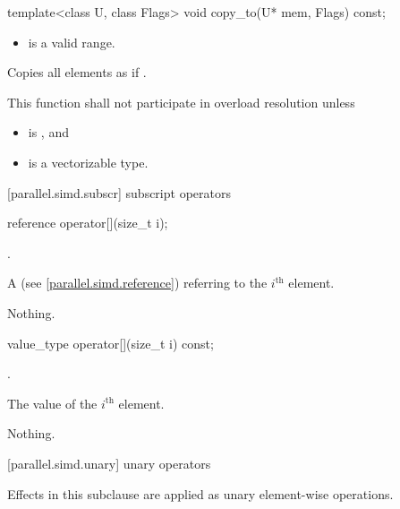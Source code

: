 \begin{itemdecl}
template<class U, class Flags> void copy_to(U* mem, Flags) const;
\end{itemdecl}

\begin{itemdescr}
  \pnum\requires
  \begin{itemize}
    \item \tcode{[mem, mem + size())} is a valid range.
  \end{itemize}

  \pnum\effects
  Copies all  elements as if  \foralli.

  \pnum\remarks
  This function shall not participate in overload resolution unless
  \begin{itemize}
    \item {} is , and
    \item {} is a vectorizable type.
  \end{itemize}
\end{itemdescr}

[parallel.simd.subscr]{ subscript operators}

\begin{itemdecl}
reference operator[](size_t i);
\end{itemdecl}

\begin{itemdescr}
  \pnum\requires
  .

  \pnum\returns
  A  (see \ref{parallel.simd.reference}) referring to the $i^\text{th}$ element.

  \pnum\throws Nothing.
\end{itemdescr}

\begin{itemdecl}
value_type operator[](size_t i) const;
\end{itemdecl}

\begin{itemdescr}
  \pnum\requires
  .

  \pnum\returns
  The value of the $i^\text{th}$ element.

  \pnum\throws Nothing.
\end{itemdescr}

[parallel.simd.unary]{ unary operators}

\pnum
Effects in this subclause are applied as unary element-wise operations.

